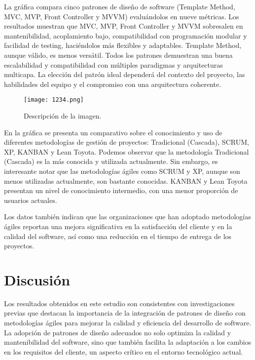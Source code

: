\documentclass{article}
\begin{document}
La gráfica compara cinco patrones de diseño de software (Template Method, MVC, MVP, Front Controller y MVVM) evaluándolos en nueve métricas. Los resultados muestran que MVC, MVP, Front Controller y MVVM sobresalen en mantenibilidad, acoplamiento bajo, compatibilidad con programación modular y facilidad de testing, haciéndolos más flexibles y adaptables. Template Method, aunque válido, es menos versátil. Todos los patrones demuestran una buena escalabilidad y compatibilidad con múltiples paradigmas y arquitecturas multicapa. La elección del patrón ideal dependerá del contexto del proyecto, las habilidades del equipo y el compromiso con una arquitectura coherente.

\begin{figure}[h] %
    \centering %
    \texttt{[image: 1234.png]} %
    \caption{Descripción de la imagen.} %
    \label{fig:mi_imagen} %
\end{figure}

En la gráfica se presenta un comparativo sobre el conocimiento y uso de diferentes metodologías de gestión de proyectos: Tradicional (Cascada), SCRUM, XP, KANBAN y Lean Toyota. Podemos observar que la metodología Tradicional (Cascada) es la más conocida y utilizada actualmente. Sin embargo, es interesante notar que las metodologías ágiles como SCRUM y XP, aunque son menos utilizadas actualmente, son bastante conocidas. KANBAN y Lean Toyota presentan un nivel de conocimiento intermedio, con una menor proporción de usuarios actuales.

Los datos también indican que las organizaciones que han adoptado metodologías ágiles reportan una mejora significativa en la satisfacción del cliente y en la calidad del software, así como una reducción en el tiempo de entrega de los proyectos.

\section{Discusión}
Los resultados obtenidos en este estudio son consistentes con investigaciones previas que destacan la importancia de la integración de patrones de diseño con metodologías ágiles para mejorar la calidad y eficiencia del desarrollo de software. La adopción de patrones de diseño adecuados no solo optimiza la calidad y mantenibilidad del software, sino que también facilita la adaptación a los cambios en los requisitos del cliente, un aspecto crítico en el entorno tecnológico actual.
\end{document}
